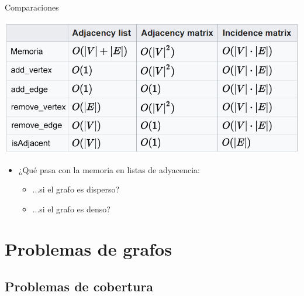 \documentclass{beamer} %
\begin{document}
\begin{frame}{Comparaciones}
    \begin{center}
      \includegraphics[width=\textwidth]{./image/cap6/represent-complexity.png}
    \end{center}
    \begin{itemize}
        \item ¿Qué pasa con la memoria en listas de adyacencia:
        \begin{itemize}
            \item ...si el grafo es disperso? 
            \item ...si el grafo es denso? 
        \end{itemize}
    \end{itemize}
\end{frame}

\section{Problemas de grafos}

\subsection{Problemas de cobertura}
\end{document}
